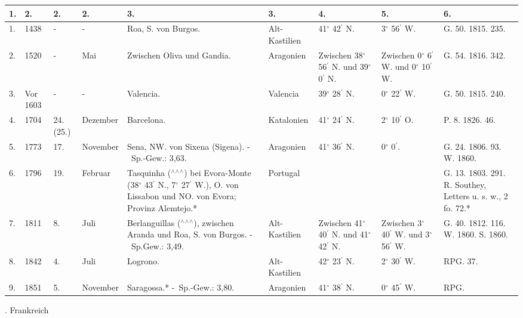 \documentclass[a4paper, 11pt, oneside, polutonikogreek, german]{article}
\begin{document}
\begin{table}[!ht]
    \centering
    \begin{tabular}{|l|l|l|l|l|l|l|l|l|}
    \hline
        1. & 2. & 2. & 2. & 3. & 3. & 4. & 5. & 6. \\ \hline
        1. & 1438 & - & - & Roa, S. von Burgos. & Alt-Kastilien & 41$^\circ$ 42$^\prime$ N. & 3$^\circ$ 56$^\prime$ W. & G. 50. 1815. 235. \\ \hline
        2. & 1520 & - & Mai & Zwischen Oliva und Gandia. & Aragonien & Zwischen 38$^\circ$ 56$^\prime$ N. und 39$^\circ$ 0$^\prime$ N. & Zwischen 0$^\circ$ 6$^\prime$ W. und 0$^\circ$ 10$^\prime$ W. & G. 54. 1816. 342. \\ \hline
        3. & Vor 1603 & - & - & Valencia. & Valencia & 39$^\circ$ 28$^\prime$ N. & 0$^\circ$ 22$^\prime$ W. & G. 50. 1815. 240. \\ \hline
        4. & 1704 & 24. (25.) & Dezember & Barcelona. & Katalonien & 41$^\circ$ 24$^\prime$ N. & 2$^\circ$ 10$^\prime$ O. & P. 8. 1826. 46. \\ \hline
        5. & 1773 & 17. & November & Sena, NW. von Sixena (Sigena). - Sp.-Gew.: 3,63. & Aragonien & 41$^\circ$ 36$^\prime$ N. & 0$^\circ$ 0$^\prime$. & G. 24. 1806. 93. W. 1860. \\ \hline
        6. & 1796 & 19. & Februar & Tasquinha ($^\wedge$$^\wedge$$^\wedge$) bei Evora-Monte (38$^\circ$ 43$^\prime$ N., 7$^\circ$ 27$^\prime$ W.), O. von Lissabon und NO. von Evora; Provinz Alemtejo.* & Portugal & ~ & ~ & G. 13. 1803. 291. R. Southey, Letters u. s. w., 2 fo. 72.* \\ \hline
        7. & 1811 & 8. & Juli & Berlanguillas ($^\wedge$$^\wedge$$^\wedge$), zwischen Aranda und Roa, S. von Burgos. - Sp.Gew.: 3,49. & Alt-Kastilien & Zwischen 41$^\circ$ 40$^\prime$ N. und 41$^\circ$ 42$^\prime$ N. & Zwischen 3$^\circ$ 40$^\prime$ W. und 3$^\circ$ 56$^\prime$ W. & G. 40. 1812. 116. W. 1860. S. 1860. \\ \hline
        8. & 1842 & 4. & Juli & Logrono. & Alt-Kastilien & 42$^\circ$ 23$^\prime$ N. & 2$^\circ$ 30$^\prime$ W. & RPG. 37. \\ \hline
        9. & 1851 & 5. & November & Saragossa.* - Sp.-Gew.: 3,80. & Aragonien & 41$^\circ$ 38$^\prime$ N. & 0$^\circ$ 45$^\prime$ W. & RPG. \\ \hline
    \end{tabular}
\end{table}
. Frankreich
\end{document}
